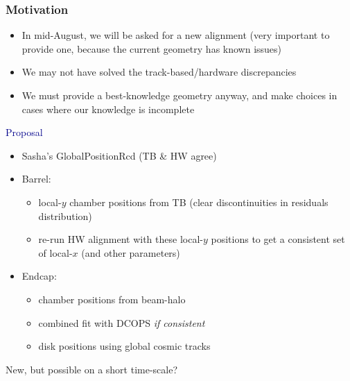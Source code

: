 \documentclass[compress]{beamer}
\begin{document}
\begin{frame}
\frametitle{Motivation}
\begin{itemize}
\item In mid-August, we will be asked for a new alignment (very important to provide one, because the current geometry has known issues)
\item We may not have solved the track-based/hardware discrepancies
\item We must provide a best-knowledge geometry anyway, and make choices in cases where our knowledge is incomplete
\end{itemize}

\vfill
\hspace{-0.83 cm} \textcolor{darkblue}{\Large Proposal}
\begin{itemize}
\item Sasha's GlobalPositionRcd (TB \& HW agree)
\item Barrel:
\begin{itemize}
\item local-$y$ chamber positions from TB (clear discontinuities in residuals distribution)
\item re-run HW alignment with these local-$y$ positions to get a consistent set of local-$x$ (and other parameters)\textcolor{red}{\large *}
\end{itemize}

\item Endcap:
\begin{itemize}
\item chamber positions from beam-halo
\item combined fit with DCOPS {\it if consistent}\textcolor{red}{\large *}
\item disk positions using global cosmic tracks
\end{itemize}
\end{itemize}

\textcolor{red}{\large *} New, but possible on a short time-scale?
\label{numpages}
\end{frame}




\end{document}
